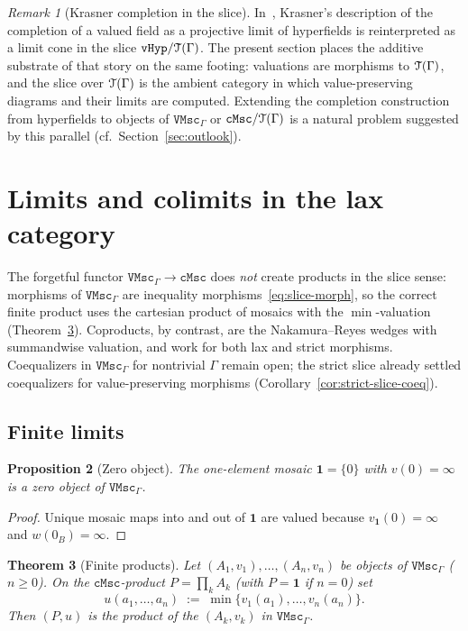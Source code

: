 \documentclass[11pt]{amsart}
\theoremstyle{plain}
\newtheorem{theorem}{Theorem}[section]
\newtheorem{proposition}[theorem]{Proposition}
\theoremstyle{definition}
\theoremstyle{remark}
\newtheorem{remark}[theorem]{Remark}
\newcommand{\T}{\EuScript{T}}
\newcommand{\cMsc}{\mathtt{cMsc}}
\newcommand{\VMscG}{\mathtt{VMsc}_{\Gamma}}
\begin{document}
\begin{remark}[Krasner completion in the slice]
\label{rem:krasner-slice}
In~\cite{Lin23compl}, Krasner's description of the completion of a valued field as a projective limit of hyperfields is reinterpreted as a limit cone in the slice \(\mathtt{vHyp}/\T(\Gamma)\). The present section places the additive substrate of that story on the same footing: valuations are morphisms to \(\T(\Gamma)\), and the slice over \(\T(\Gamma)\) is the ambient category in which value-preserving diagrams and their limits are computed. Extending the completion construction from hyperfields to objects of \(\VMscG\) or \(\cMsc/\T(\Gamma)\) is a natural problem suggested by this parallel (cf.\ Section~\ref{sec:outlook}).
\end{remark}


\section{Limits and colimits in the lax category}
\label{sec:lax}

The forgetful functor \(\VMscG\to\cMsc\) does \emph{not} create products in the slice sense: morphisms of \(\VMscG\) are inequality morphisms~\eqref{eq:slice-morph}, so the correct finite product uses the cartesian product of mosaics with the \(\min\)-valuation (Theorem~\ref{thm:vmsc-prod}). Coproducts, by contrast, are the Nakamura--Reyes wedges with summandwise valuation, and work for both lax and strict morphisms. Coequalizers in \(\VMscG\) for nontrivial \(\Gamma\) remain open; the strict slice already settled coequalizers for value-preserving morphisms (Corollary~\ref{cor:strict-slice-coeq}).

\subsection{Finite limits}


\begin{proposition}[Zero object]
\label{prop:vmsc-zero}
The one-element mosaic \(\mathbf{1}=\{0\}\) with \(v(0)=\infty\) is a zero object of \(\VMscG\).
\end{proposition}

\begin{proof}
Unique mosaic maps into and out of \(\mathbf{1}\) are valued because \(v_{\mathbf{1}}(0)=\infty\) and \(w(0_B)=\infty\).
\end{proof}

\begin{theorem}[Finite products]
\label{thm:vmsc-prod}
Let \((A_1,v_1),\ldots,(A_n,v_n)\) be objects of \(\VMscG\) (\(n\ge 0\)). On the \(\cMsc\)-product \(P=\prod_k A_k\) (with \(P=\mathbf{1}\) if \(n=0\)) set
\[
u(a_1,\ldots,a_n)\;:=\;\min\bigl\{v_1(a_1),\ldots,v_n(a_n)\bigr\}.
\]
Then \((P,u)\) is the product of the \((A_k,v_k)\) in \(\VMscG\).
\end{theorem}
\end{document}
